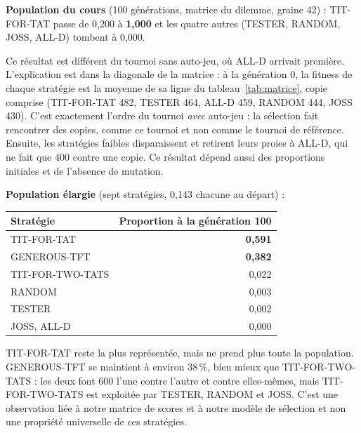 \documentclass[10pt,a4paper]{article}
\begin{document}
\textbf{Population du cours} (100 générations, matrice du dilemme, graine 42) : TIT-FOR-TAT passe de 0,200 à \textbf{1,000} et
les quatre autres (TESTER, RANDOM, JOSS, ALL-D) tombent à 0,000.

Ce résultat est différent du tournoi sans auto-jeu, où ALL-D arrivait première. L'explication est dans la diagonale de la
matrice : à la génération 0, la fitness de chaque stratégie est la moyenne de sa ligne du tableau~\ref{tab:matrice}, copie
comprise (TIT-FOR-TAT 482, TESTER 464, ALL-D 459, RANDOM 444, JOSS 430). C'est exactement l'ordre du tournoi \emph{avec}
auto-jeu : la sélection fait rencontrer des copies, comme ce tournoi et non comme le tournoi de référence. Ensuite, les
stratégies faibles disparaissent et retirent leurs proies à ALL-D, qui ne fait que 400 contre une copie. Ce résultat dépend
aussi des proportions initiales et de l'absence de mutation.

\textbf{Population élargie} (sept stratégies, 0,143 chacune au départ) :
\begin{center}
\small
\begin{tabular}{@{}lr@{}}
\toprule
Stratégie & Proportion à la génération 100 \\
\midrule
TIT-FOR-TAT & \textbf{0,591} \\
GENEROUS-TFT & \textbf{0,382} \\
TIT-FOR-TWO-TATS & 0,022 \\
RANDOM & 0,003 \\
TESTER & 0,002 \\
JOSS, ALL-D & 0,000 \\
\bottomrule
\end{tabular}
\end{center}
TIT-FOR-TAT reste la plus représentée, mais ne prend plus toute la population. GENEROUS-TFT se maintient à environ 38\,\%, bien
mieux que TIT-FOR-TWO-TATS : les deux font 600 l'une contre l'autre et contre elles-mêmes, mais TIT-FOR-TWO-TATS est exploitée
par TESTER, RANDOM et JOSS. C'est une observation liée à notre matrice de scores et à notre modèle de sélection et non une
propriété universelle de ces stratégies.
\end{document}

